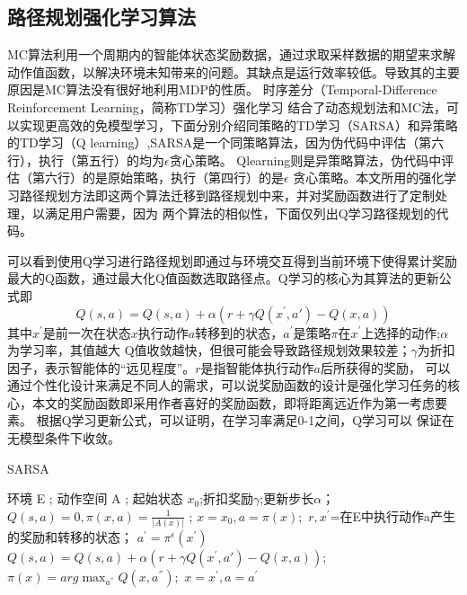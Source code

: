\subsection{路径规划强化学习算法}
MC算法利用一个周期内的智能体状态奖励数据，通过求取采样数据的期望来求解动作值函数，以解决环境未知带来的问题。其缺点是运行效率较低。导致其的主要原因是MC算法没有很好地利用MDP的性质。
时序差分（Temporal-Difference Reinforcement Learning，简称TD学习）强化学习
结合了动态规划法和MC法，可以实现更高效的免模型学习，下面分别介绍同策略的TD学习（SARSA）和异策略的TD学习（Q
learning）,SARSA是一个同策略算法，因为伪代码中评估（第六行），执行（第五行）的均为$\epsilon$贪心策略。
Qlearning则是异策略算法，伪代码中评估（第六行）的是原始策略，执行（第四行）的是$\epsilon$
贪心策略。本文所用的强化学习路径规划方法即这两个算法迁移到路径规划中来，并对奖励函数进行了定制处理，以满足用户需要，因为
两个算法的相似性，下面仅列出Q学习路径规划的代码。

可以看到使用Q学习进行路径规划即通过与环境交互得到当前环境下使得累计奖励最大的Q函数，通过最大化Q值函数选取路径点。Q学习的核心为其算法的更新公式即
\begin{equation}
  Q(s,a)=Q(s,a)+\alpha (r+\gamma Q(x^{'},a{'})-Q(x,a))
  \label{eq:3-12}
\end{equation}
其中$x^{'}$是前一次在状态$x$执行动作$a$转移到的状态，$a^{'}$是策略$\pi$在$x^{'}$上选择的动作;$\alpha$为学习率，其值越大
Q值收敛越快，但很可能会导致路径规划效果较差；$\gamma$为折扣因子，表示智能体的“远见程度”。$r$是指智能体执行动作$a$后所获得的奖励，
可以通过个性化设计来满足不同人的需求，可以说奖励函数的设计是强化学习任务的核心，本文的奖励函数即采用作者喜好的奖励函数，即将距离远近作为第一考虑要素。
根据Q学习更新公式，可以证明，在学习率满足0-1之间，Q学习可以
保证在无模型条件下收敛。\\
\begin{algorithm}[H]  
  \caption{SARSA}  
  \begin{algorithmic}[1] 
    \Require 环境 E ; 动作空间 A ;
     起始状态 $x_0$;折扣奖励$\gamma $;更新步长$\alpha $；
    \Ensure 
    \State $Q(s,a)=0,\pi(x,a)=\frac{1}{|A(x)|} $ ;
    \State $x=x_0,a=\pi(x);$
    \State $r,x^{'}$=在E中执行动作a产生的奖励和转移的状态；
    \State $a^{'}=\pi^{\epsilon }(x^{'})$
    \State $Q(s,a)=Q(s,a)+\alpha (r+\gamma Q(x^{'},a{'})-Q(x,a));$
    \State $\pi(x)=arg\max_{a^{''}}Q(x,a^{''});$
    \State $x=x^{'},a=a^{'}$
    \EndFor   
  \end{algorithmic}  
\end{algorithm}

